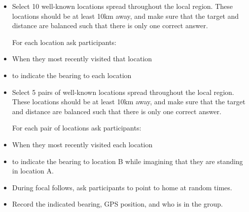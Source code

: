 \documentclass[idxtotoc,hyperref,openany]{labbook} %
\begin{document}



\begin{itemize}

\item Select 10 well-known locations spread throughout the local region.  These locations should be at least 10km away, and make sure that the target and distance are balanced such that there is only one correct answer.

For each location ask participants:

\item When they most recently visited that location

\item to indicate the bearing to each location

\end{itemize}



\begin{itemize}

\item Select 5 pairs of well-known locations spread throughout the local region.  These locations should be at least 10km away, and make sure that the target and distance are balanced such that there is only one correct answer.

For each pair of locations ask participants:

\item When they most recently visited each location

\item to indicate the bearing to location B while imagining that they are standing in location A.

\end{itemize}



\begin{itemize}

\item During focal follows, ask participants to point to home at random times.

\item Record the indicated bearing, GPS position, and who is in the group.

\end{itemize}
\end{document}
